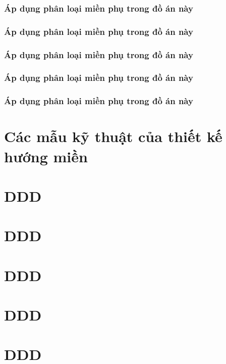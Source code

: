 \subsubsection{Áp dụng phân loại miền phụ trong đồ án này}

\subsubsection{Áp dụng phân loại miền phụ trong đồ án này}

\subsubsection{Áp dụng phân loại miền phụ trong đồ án này}

\subsubsection{Áp dụng phân loại miền phụ trong đồ án này}

\subsubsection{Áp dụng phân loại miền phụ trong đồ án này}

\section{Các mẫu kỹ thuật của thiết kế hướng miền}

\section{DDD}

\section{DDD}

\section{DDD}

\section{DDD}

\section{DDD}

